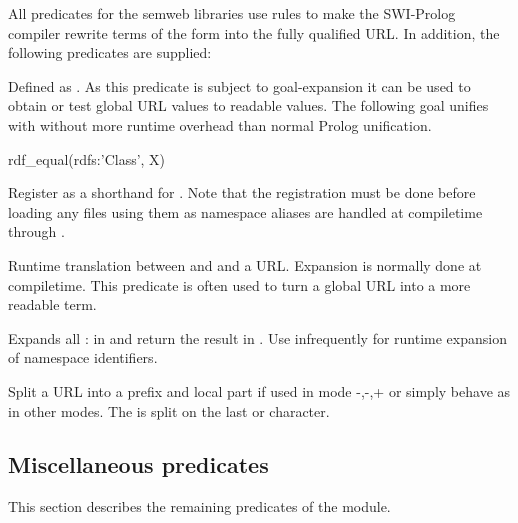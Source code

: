 \documentclass[11pt]{article}
\begin{document}
\noindent
All predicates for the semweb libraries use  rules to
make the SWI-Prolog compiler rewrite terms of the form
 into the fully qualified URL.  In addition,
the following predicates are supplied:

\begin{description}
Defined as .  As this predicate is
subject to goal-expansion it can be used to obtain or test global URL
values to readable values. The following goal unifies  with
 without more
runtime overhead than normal Prolog unification.

\begin{code}
        rdf_equal(rdfs:'Class', X)
\end{code}

\noindent
Register  as a shorthand for .  Note that the
registration must be done before loading any files using them as
namespace aliases are handled at compiletime through .

Runtime translation between  and  and a
 URL.  Expansion is normally done at compiletime.  This
predicate is often used to turn a global URL into a more readable
term.

Expands all : in  and return the
result in .  Use infrequently for runtime expansion of
namespace identifiers.

Split a URL into a prefix and local part if used in mode -,-,+
or simply behave as  in other modes.  The 
is split on the last \chr{\#} or \chr{/} character.
\end{description}


\subsection{Miscellaneous predicates}

This section describes the remaining predicates of the 
module.
\end{document}
